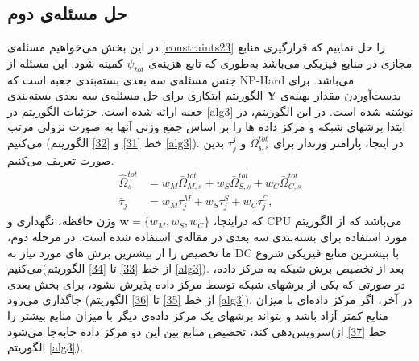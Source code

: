 \subsection{ حل مسئله‌ی دوم}
در این بخش می‌خواهیم مسئله‌ی \eqref{constraints23} را حل نماییم که قرارگیری منابع مجازی در منابع فیزیکی می‌باشد به‌طوری که تابع هزینه‌ی  $\psi_{tot}$ کمینه شود. این مسئله از جنس مسئله‌ی سه بعدی بسته‌بندی جعبه است که NP-Hard می‌باشد. 
برای بدست‌آوردن مقدار بهینه‌ی $\boldsymbol{Y}$ الگوریتم ابتکاری برای حل مسئله‌ی سه بعدی بسته‌بندی جعبه ارائه شده است.
جزئیات الگوریتم در \eqref{alg3} نوشته شده است. در این الگوریتم، در ابتدا برشهای شبکه و مرکز داده ها را بر اساس  جمع وزنی آنها به صورت نزولی مرتب می‌کنیم (خط \ref{31} و \ref{32} الگوریتم \ref{alg3}).
در اینجا، پارامتر وزندار برای $\Omega_{\mathfrak{z},s}^{tot}$ و $\tau_j^\mathfrak{z}$ بدین صورت تعریف می‌کنیم.
\begin{equation}\label{wt}
	\begin{split}
		\hat{\Omega}_{s}^{tot} &= w_M \bar{\Omega}_{M,s}^{tot} + w_S \bar{\Omega}_{S,s}^{tot} + w_C \bar{\Omega}_{C,s}^{tot} \\
		\hat{\tau}_j &= w_M \tau_{{j}}^M + w_S \tau_{{j}}^S + w_C \tau_{{j}}^C,
	\end{split}
\end{equation}
که دراینجا، $\boldsymbol{w} = \{w_M, w_S, w_C\}$ وزن حافظه، نگهداری و CPU می‌باشد
که  از الگوریتم مورد استفاده برای بسته‌بندی سه بعدی در مقاله‌ی 
\cite{3dbin}
استفاده شده است.
در مرحله دوم، ما تخصیص را از بیشترین برش های مورد نیاز به DC با بیشترین منابع فیزیکی شروع می‌کنیم(از خط \ref{33} تا \ref{34} الگوریتم \ref{alg3}).
 بعد از تخصیص برش شبکه به مرکز داده، در صورتی که یکی از برشهای شبکه توسط مرکز داده پذیرش نشود، برای بخش بعدی جاگذاری می‌رود
 (از خط \ref{35} تا \ref{36} الگوریتم \ref{alg3}).
 در آخر، اگر مرکز داده‌ای با میزان منابع کمتر آزاد باشد و بتواند برشهای یک مرکز داده‌ی دیگر با میزان منابع بیشتر را سرویس‌دهی کند، 
 تخصیص منابع بین این دو مرکز داده جابه‌جا می‌شود(خط \ref{37} از الگوریتم \ref{alg3}). 
